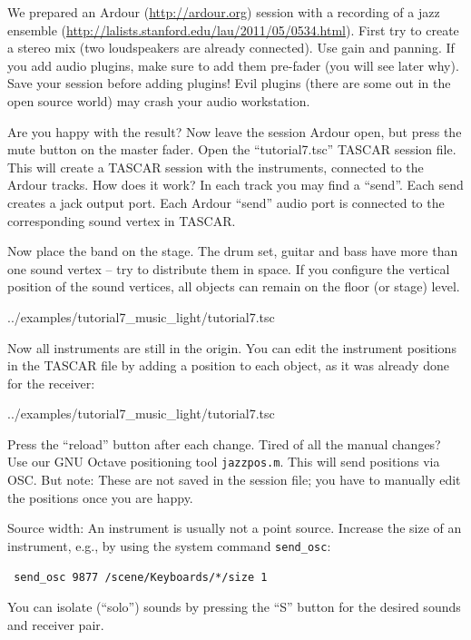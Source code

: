 \documentclass[11pt,a4paper,twoside]{article}
\begin{document}
We prepared an Ardour (\url{http://ardour.org}) session with a
recording of a jazz ensemble
(\url{http://lalists.stanford.edu/lau/2011/05/0534.html}).
%
First try to create a stereo mix (two loudspeakers are already connected).
%
Use gain and panning. If you add audio plugins, make sure to add them pre-fader (you will see later why).
%
Save your session before adding plugins! Evil plugins (there are some
out in the open source world) may crash your audio workstation.

Are you happy with the result?
%
Now leave the session Ardour open, but press the mute button on the master fader.
%
Open the ``tutorial7.tsc'' TASCAR session file. This will create a
TASCAR session with the instruments, connected to the Ardour tracks.
%
How does it work?
%
In each track you may find a ``send''. Each send creates a jack output
port. Each Ardour ``send'' audio port is connected to the
corresponding sound vertex in TASCAR.

Now place the band on the stage. The drum set, guitar and bass have
more than one sound vertex -- try to distribute them in space. If you
configure the vertical position of the sound vertices, all objects can
remain on the floor (or stage) level.

\begin{lstinputlisting}[language=tsc,caption={},linerange=10-11,firstnumber=10]{../examples/tutorial7_music_light/tutorial7.tsc}
\end{lstinputlisting}

Now all instruments are still in the origin. You can edit the
instrument positions in the TASCAR file by adding a position to each
object, as it was already done for the receiver:
\begin{lstinputlisting}[language=tsc,linerange=30-32,firstnumber=30,caption={}]{../examples/tutorial7_music_light/tutorial7.tsc}
\end{lstinputlisting}
Press the ``reload'' button after each change. Tired of all the manual
changes? Use our GNU Octave positioning tool \verb!jazzpos.m!. This
will send positions via OSC. But note: These are not saved in the
session file; you have to manually edit the positions once you are
happy.

Source width: An instrument is usually not a point source. Increase the size of an instrument, e.g., by using the system command \verb!send_osc!:
\begin{verbatim}
 send_osc 9877 /scene/Keyboards/*/size 1
\end{verbatim}
You can isolate (``solo'') sounds by pressing the ``S'' button for the desired sounds and receiver pair.
\end{document}
